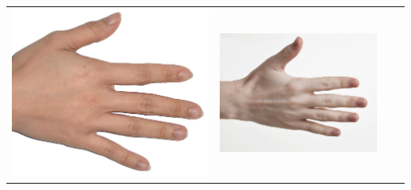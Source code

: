 \begin{longtable}{|N||c|c|c|}
  \begin{minipage}{.29\textwidth}
    \includegraphics[width=\textwidth,height=\textheight,keepaspectratio]{../inputs/hand_light.jpg}
  \end{minipage} & 
  \begin{minipage}{.29\textwidth}
    \includegraphics[width=\textwidth,height=\textheight,keepaspectratio]{../inputs/hand_pale.jpg}
  \end{minipage} & 
  \begin{minipage}{.29\textwidth}

\end{minipage}
\end{longtable}
